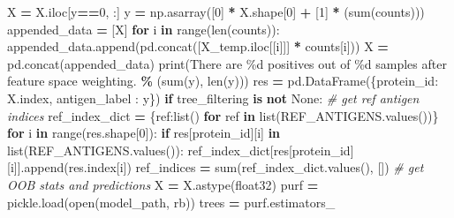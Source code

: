 \documentclass[
  11pt,
  oneside]{book}
\newenvironment{Shaded}{\begin{snugshade}}{\end{snugshade}}
\newcommand{\BuiltInTok}[1]{#1}
\newcommand{\CommentTok}[1]{\textcolor[rgb]{0.56,0.35,0.01}{\textit{#1}}}
\newcommand{\ControlFlowTok}[1]{\textcolor[rgb]{0.13,0.29,0.53}{\textbf{#1}}}
\newcommand{\DecValTok}[1]{\textcolor[rgb]{0.00,0.00,0.81}{#1}}
\newcommand{\KeywordTok}[1]{\textcolor[rgb]{0.13,0.29,0.53}{\textbf{#1}}}
\newcommand{\NormalTok}[1]{#1}
\newcommand{\OperatorTok}[1]{\textcolor[rgb]{0.81,0.36,0.00}{\textbf{#1}}}
\newcommand{\SpecialCharTok}[1]{\textcolor[rgb]{0.00,0.00,0.00}{#1}}
\newcommand{\StringTok}[1]{\textcolor[rgb]{0.31,0.60,0.02}{#1}}
\newcommand{\VariableTok}[1]{\textcolor[rgb]{0.00,0.00,0.00}{#1}}
\begin{document}
\begin{Shaded}
\begin{Highlighting}[]
\NormalTok{    X }\OperatorTok{=}\NormalTok{ X.iloc[y}\OperatorTok{==}\DecValTok{0}\NormalTok{, :]}
\NormalTok{    y }\OperatorTok{=}\NormalTok{ np.asarray([}\DecValTok{0}\NormalTok{] }\OperatorTok{*}\NormalTok{ X.shape[}\DecValTok{0}\NormalTok{] }\OperatorTok{+}\NormalTok{ [}\DecValTok{1}\NormalTok{] }\OperatorTok{*}\NormalTok{ (}\BuiltInTok{sum}\NormalTok{(counts)))}
\NormalTok{    appended\_data }\OperatorTok{=}\NormalTok{ [X]}
    \ControlFlowTok{for}\NormalTok{ i }\KeywordTok{in} \BuiltInTok{range}\NormalTok{(}\BuiltInTok{len}\NormalTok{(counts)):}
\NormalTok{        appended\_data.append(pd.concat([X\_temp.iloc[[i]]] }\OperatorTok{*}\NormalTok{ counts[i]))}
\NormalTok{    X }\OperatorTok{=}\NormalTok{ pd.concat(appended\_data)}
    \BuiltInTok{print}\NormalTok{(}\StringTok{\textquotesingle{}There are }\SpecialCharTok{\%d}\StringTok{ positives out of }\SpecialCharTok{\%d}\StringTok{ samples after feature space weighting.\textquotesingle{}} \OperatorTok{\%}\NormalTok{ (}\BuiltInTok{sum}\NormalTok{(y), }\BuiltInTok{len}\NormalTok{(y)))}
\NormalTok{    res }\OperatorTok{=}\NormalTok{ pd.DataFrame(\{}\StringTok{\textquotesingle{}protein\_id\textquotesingle{}}\NormalTok{: X.index, }\StringTok{\textquotesingle{}antigen\_label\textquotesingle{}}\NormalTok{ : y\})}
    \ControlFlowTok{if}\NormalTok{ tree\_filtering }\KeywordTok{is} \KeywordTok{not} \VariableTok{None}\NormalTok{:}
        \CommentTok{\# get ref antigen indices}
\NormalTok{        ref\_index\_dict }\OperatorTok{=}\NormalTok{ \{ref:}\BuiltInTok{list}\NormalTok{() }\ControlFlowTok{for}\NormalTok{ ref }\KeywordTok{in} \BuiltInTok{list}\NormalTok{(REF\_ANTIGENS.values())\}}
        \ControlFlowTok{for}\NormalTok{ i }\KeywordTok{in} \BuiltInTok{range}\NormalTok{(res.shape[}\DecValTok{0}\NormalTok{]):}
            \ControlFlowTok{if}\NormalTok{ res[}\StringTok{\textquotesingle{}protein\_id\textquotesingle{}}\NormalTok{][i] }\KeywordTok{in} \BuiltInTok{list}\NormalTok{(REF\_ANTIGENS.values()):}
\NormalTok{                ref\_index\_dict[res[}\StringTok{\textquotesingle{}protein\_id\textquotesingle{}}\NormalTok{][i]].append(res.index[i])}
\NormalTok{        ref\_indices }\OperatorTok{=} \BuiltInTok{sum}\NormalTok{(ref\_index\_dict.values(), [])}
        \CommentTok{\# get OOB stats and predictions}
\NormalTok{        X }\OperatorTok{=}\NormalTok{ X.astype(}\StringTok{\textquotesingle{}float32\textquotesingle{}}\NormalTok{)}
\NormalTok{        purf }\OperatorTok{=}\NormalTok{ pickle.load(}\BuiltInTok{open}\NormalTok{(model\_path, }\StringTok{\textquotesingle{}rb\textquotesingle{}}\NormalTok{))}
\NormalTok{        trees }\OperatorTok{=}\NormalTok{ purf.estimators\_}

\end{Highlighting}
\end{Shaded}
\end{document}
